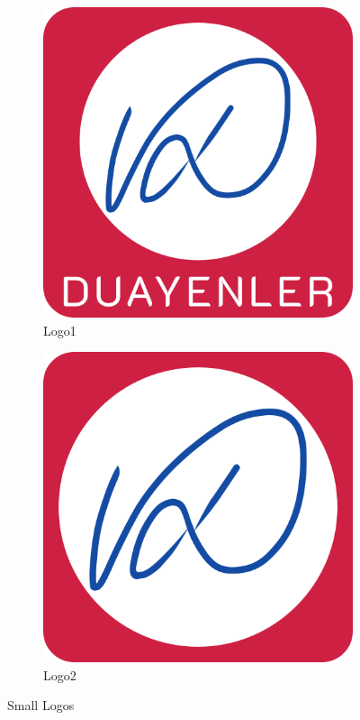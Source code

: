 \documentclass[a4paper,12pt]{article}
\begin{document}
\begin{figure}[H]
	\setlength{\unitlength}{\textwidth} 
	\centering
	\begin{subfigure}{.5\textwidth}
  		\centering
  		\includegraphics[width=0.48\unitlength]{images/logo1}
  		\caption{\label{fig:logo1}Logo1 }
	\end{subfigure}%
	\begin{subfigure}{.5\textwidth}
  		\centering
		\includegraphics[width=0.48\unitlength]{images/logo2}
  		\caption{\label{fig:logo2}Logo2}
	\end{subfigure}
\caption{\label{fig:calisandegree} Small Logos   }
\end{figure}
	
\end{document}

